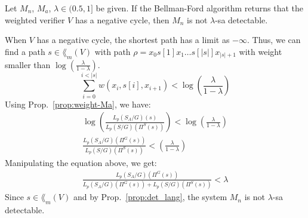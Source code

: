 \begin{theorem}\label{theo:negative-cycle}
Let $M_n$, $M_a$, $\lambda \in (0.5,1]$ be given.
If the Bellman-Ford algorithm returns that the weighted verifier $V$ has a negative cycle, then $M_n$ is not $\lambda$-sa detectable.
\end{theorem}

\proof
When $V$ has a negative cycle, the shortest path has a limit as $-\infty$.
Thus, we can find a path $s\in \lang_m(V)$ with path $\rho = x_0s[1]x_1\dots s[|s|]x_{|s|+1}$ with weight smaller than $\log(\frac{\lambda}{1-\lambda})$.
$$\sum_{i=0}^{i<|s|}w(x_i,s[i],x_{i+1})< \log\left(\frac{\lambda}{1-\lambda}\right)$$
Using Prop.~\ref{prop:weight-Ma}, we have:
\begin{align*}
\log\left(\frac{L_p(S_A/G)(s)}{L_p(S/G)(\Pi^S(s))}\right)< \log\left(\frac{\lambda}{1-\lambda}\right)\\
\frac{L_p(S_A/G)(\Pi^G(s))}{L_p(S/G)(\Pi^S(s))}<\left(\frac{\lambda}{1-\lambda}\right)
\end{align*}
Manipulating the equation above, we get:
\begin{align*}
\frac{L_p(S_A/G)(\Pi^G(s))}{L_p(S_A/G)(\Pi^G(s))+L_p(S/G)(\Pi^S(s))}< \lambda 
\end{align*}
Since $s\in \lang_m(V)$ and by Prop.~\ref{prop:det_lang}, the system $M_n$ is not $\lambda$-sa detectable.
\endproof

